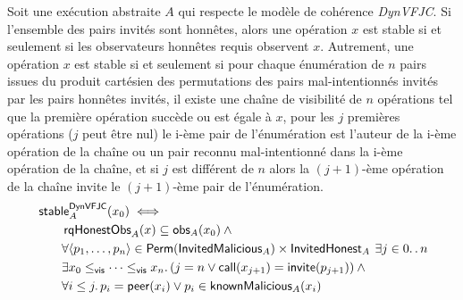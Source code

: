 \begin{theorem}\label{th:svfjc-stability}
Soit une exécution abstraite $A$ qui respecte le modèle de cohérence \emph{DynVFJC}.
Si l'ensemble des pairs invités sont honnêtes, alors une opération $x$ est stable si et seulement si les observateurs honnêtes requis observent $x$.
Autrement, une opération $x$ est stable si et seulement si pour chaque énumération de $n$ pairs issues du produit cartésien des permutations des pairs mal-intentionnés invités par les pairs honnêtes invités, il existe une chaîne de visibilité de $n$ opérations tel que la première opération succède ou est égale à $x$, pour les $j$ premières opérations ($j$ peut être nul) le i-ème pair de l'énumération est l'auteur de la i-ème opération de la chaîne ou un pair reconnu mal-intentionné dans la i-ème opération de la chaîne, et si $j$ est différent de $n$ alors la $(j+1)$-ème opération de la chaîne invite le $(j+1)$-ème pair de l'énumération.
\begin{equation*}\begin{split}
\MoveEqLeft\trm{stable}_A^{\trm{DynVFJC}}(x_0) \iff\\
    &\trm{rqHonestObs}_A(x) \subseteq \trm{obs}_A(x_0) \:\land \\
    &\forall \tuple*{p_1, \dotsc, p_n} \in \trm{Perm}(\trm{InvitedMalicious}_A) \times \trm{InvitedHonest}_A
    \:\exists j \in 0 \ldotp\ldotp n \\
    & \exists x_0 \viseq \dotsb \viseq x_n \qsep
    (j = n \lor \trm{call}(x_{j+1}) = \trm{invite}(p_{j+1})) \:\land\\
    &\forall i \leq j \qsep p_i = \trm{peer}(x_i) \lor p_i \in \trm{knownMalicious}_A(x_i)
\end{split}\end{equation*}
\end{theorem}

